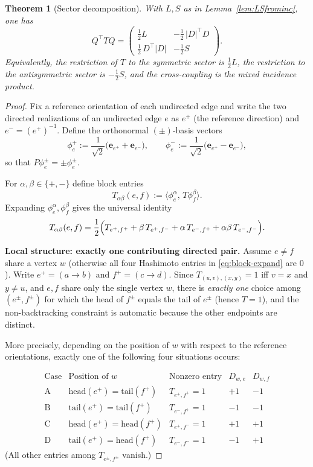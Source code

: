 \documentclass[10pt,a4paper]{amsart}
\newtheorem{theorem}{Theorem}
\begin{document}
\begin{theorem}[Sector decomposition]\label{thm:sector}
With $L,S$ as in Lemma~\ref{lem:LSfrominc}, one has
\[
Q^\top T Q
=
\begin{pmatrix}
\frac12 L & -\frac12\,|D|^\top D\\[4pt]
\frac12\,D^\top|D| & -\frac12 S
\end{pmatrix}.
\]
Equivalently, the restriction of $T$ to the symmetric sector is $\frac12 L$, the restriction to the antisymmetric sector is $-\frac12 S$, and the cross-coupling is the mixed incidence product.
\end{theorem}

\begin{proof}
Fix a reference orientation of each undirected edge and write the two directed realizations
of an undirected edge $e$ as $e^+$ (the reference direction) and $e^-=(e^+)^{-1}$.
Define the orthonormal $(\pm)$-basis vectors
\[
\phi_e^+ := \frac{1}{\sqrt2}\bigl(\mathbf e_{e^+}+\mathbf e_{e^-}\bigr),
\qquad
\phi_e^- := \frac{1}{\sqrt2}\bigl(\mathbf e_{e^+}-\mathbf e_{e^-}\bigr),
\]
so that $P\phi_e^\pm=\pm\phi_e^\pm$.

For $\alpha,\beta\in\{+,-\}$ define block entries
\[
T_{\alpha\beta}(e,f):=\langle \phi_e^\alpha,\,T\phi_f^\beta\rangle.
\]
Expanding $\phi_e^\alpha,\phi_f^\beta$ gives the universal identity
\begin{equation}\label{eq:block-expand}
T_{\alpha\beta}(e,f)
=
\frac12\Bigl(
T_{e^+,f^+}+\beta\,T_{e^+,f^-}+\alpha\,T_{e^-,f^+}+\alpha\beta\,T_{e^-,f^-}
\Bigr).
\end{equation}

\medskip
\noindent\textbf{Local structure: exactly one contributing directed pair.}
Assume $e\neq f$ share a vertex $w$ (otherwise all four Hashimoto entries in
\eqref{eq:block-expand} are $0$). Write $e^+=(a\to b)$ and $f^+=(c\to d)$.
Since $T_{(u,v),(x,y)}=1$ iff $v=x$ and $y\neq u$, and $e,f$ share only the single
vertex $w$, there is \emph{exactly one} choice among $(e^\pm,f^\pm)$ for which the head
of $f^\pm$ equals the tail of $e^\pm$ (hence $T=1$), and the non-backtracking
constraint is automatic because the other endpoints are distinct.

More precisely, depending on the position of $w$ with respect to the reference orientations,
exactly one of the following four situations occurs:

\[
\begin{array}{c|c|c|c|c}
\text{Case} & \text{Position of }w & \text{Nonzero entry} & D_{w,e} & D_{w,f}\\\hline
\mathrm{A} & \mathrm{head}(e^+)=\mathrm{tail}(f^+) & T_{e^+,f^+}=1 & +1 & -1\\
\mathrm{B} & \mathrm{tail}(e^+)=\mathrm{tail}(f^+) & T_{e^-,f^+}=1 & -1 & -1\\
\mathrm{C} & \mathrm{head}(e^+)=\mathrm{head}(f^+) & T_{e^+,f^-}=1 & +1 & +1\\
\mathrm{D} & \mathrm{tail}(e^+)=\mathrm{head}(f^+) & T_{e^-,f^-}=1 & -1 & +1
\end{array}
\]
(All other entries among $T_{e^\pm,f^\pm}$ vanish.)


\end{proof}
\end{document}
